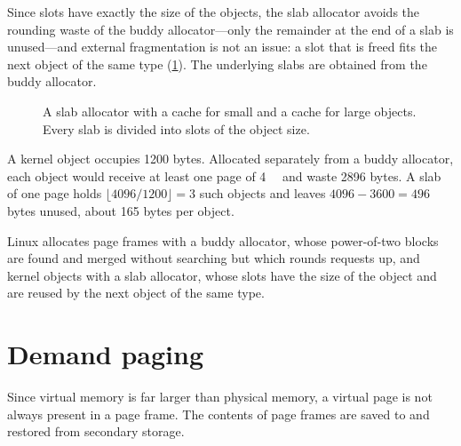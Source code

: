 \documentclass[../main.tex]{subfiles}
\begin{document}
Since slots have exactly the size of the objects, the slab allocator avoids
the rounding waste of the buddy allocator---only the remainder at the end of
a slab is unused---and external fragmentation is not an issue: a slot that is
freed fits the next object of the same type (\cref{fig:l08-slab}).  The
underlying slabs are obtained from the buddy allocator.

\begin{figure}[htbp]
  \centering
  
  \caption{A slab allocator with a cache for small and a cache for large
    objects.  Every slab is divided into slots of the object size.}
  \label{fig:l08-slab}
\end{figure}

\begin{example}
  A kernel object occupies 1200 bytes.  Allocated separately from a buddy
  allocator, each object would receive at least one page of
  \SI{4}{\kibi\byte} and waste 2896 bytes.  A slab of one page holds
  $\lfloor 4096/1200 \rfloor = 3$ such objects and leaves $4096 - 3600 =
  496$ bytes unused, about 165 bytes per object.
\end{example}

\begin{keypoint}
  Linux allocates page frames with a buddy allocator, whose power-of-two
  blocks are found and merged without searching but which rounds requests
  up, and kernel objects with a slab allocator, whose slots have the size
  of the object and are reused by the next object of the same type.
\end{keypoint}

\section{Demand paging}
\label{sec:l08-demand}

Since virtual memory is far larger than physical memory, a virtual page is
not always present in a page frame.  The contents of page frames are
saved to and restored from secondary storage.
\end{document}
